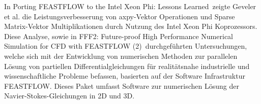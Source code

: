 In \glqq Porting FEASTFLOW to the Intel Xeon Phi: Lessons Learned\grqq\, zeigte Geveler et al. die Leistungsverbesserung von axpy-Vektor Operationen und Sparse Matrix-Vektor Multiplikationen durch Nutzung des Intel Xeon Phi Koprozessors. Diese Analyse, sowie in \glqq FFF2: Future-proof High Performance Numerical Simulation for CFD with FEASTFLOW (2)\grqq\, durchgeführten Untersuchungen, welche sich mit der Entwicklung von numerischen Methoden zur parallelen Lösung von partiellen Differentialgleichungen für realitätsnahe industrielle und wissenschaftliche Probleme befassen, basierten auf der Software Infrastruktur \glqq FEASTFLOW\grqq. Dieses Paket umfasst Software zur numerischen Lösung der Navier-Stokes-Gleichungen in 2D und 3D. 
